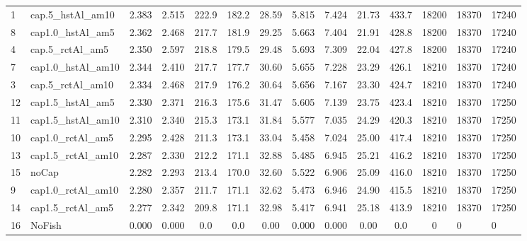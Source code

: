 \documentclass[11pt]{book}
\begin{document}
\begin{landscape}
\begin{longtable}[t]{llccccccccccll}
1 & cap.5\_hstAl\_am10 & 2.383 & 2.515 & 222.9 & 182.2 & 28.59 & 5.815 & 7.424 & 21.73 & 433.7 & 18200 & 18370 & 17240\\
8 & cap1.0\_hstAl\_am5 & 2.362 & 2.468 & 217.7 & 181.9 & 29.25 & 5.663 & 7.404 & 21.91 & 428.8 & 18200 & 18370 & 17240\\
4 & cap.5\_rctAl\_am5 & 2.350 & 2.597 & 218.8 & 179.5 & 29.48 & 5.693 & 7.309 & 22.04 & 427.8 & 18200 & 18370 & 17240\\
7 & cap1.0\_hstAl\_am10 & 2.344 & 2.410 & 217.7 & 177.7 & 30.60 & 5.655 & 7.228 & 23.29 & 426.1 & 18210 & 18370 & 17240\\
3 & cap.5\_rctAl\_am10 & 2.334 & 2.468 & 217.9 & 176.2 & 30.64 & 5.656 & 7.167 & 23.30 & 424.7 & 18210 & 18370 & 17240\\
12 & cap1.5\_hstAl\_am5 & 2.330 & 2.371 & 216.3 & 175.6 & 31.47 & 5.605 & 7.139 & 23.75 & 423.4 & 18210 & 18370 & 17250\\
11 & cap1.5\_hstAl\_am10 & 2.310 & 2.340 & 215.3 & 173.1 & 31.84 & 5.577 & 7.035 & 24.29 & 420.3 & 18210 & 18370 & 17250\\
10 & cap1.0\_rctAl\_am5 & 2.295 & 2.428 & 211.3 & 173.1 & 33.04 & 5.458 & 7.024 & 25.00 & 417.4 & 18210 & 18370 & 17250\\
13 & cap1.5\_rctAl\_am10 & 2.287 & 2.330 & 212.2 & 171.1 & 32.88 & 5.485 & 6.945 & 25.21 & 416.2 & 18210 & 18370 & 17250\\
15 & noCap & 2.282 & 2.293 & 213.4 & 170.0 & 32.60 & 5.522 & 6.906 & 25.09 & 416.0 & 18210 & 18370 & 17250\\
9 & cap1.0\_rctAl\_am10 & 2.280 & 2.357 & 211.7 & 171.1 & 32.62 & 5.473 & 6.946 & 24.90 & 415.5 & 18210 & 18370 & 17250\\
14 & cap1.5\_rctAl\_am5 & 2.277 & 2.342 & 209.8 & 171.1 & 32.98 & 5.417 & 6.941 & 25.18 & 413.9 & 18210 & 18370 & 17250\\
16 & NoFish & 0.000 & 0.000 & 0.0 & 0.0 & 0.00 & 0.000 & 0.000 & 0.00 & 0.0 & 0 & 0 & 0\\*
\end{longtable}
\end{landscape}
\endgroup{}

\newpage
\end{document}
